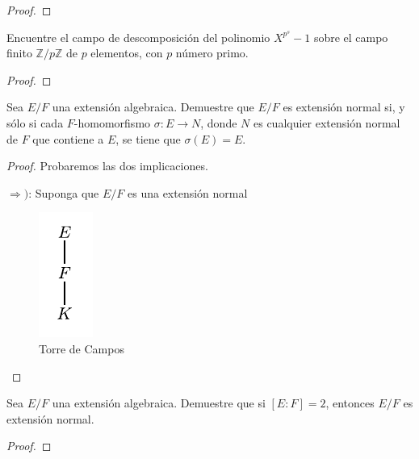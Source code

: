 \documentclass[12pt]{report}
\theoremstyle{largebreak}
\begin{document}
\begin{proof}
    
\end{proof}

\begin{excer}
    Encuentre el campo de descomposición del polinomio $X^{p^s}-1$ sobre el campo finito $\mathbb{Z}/p\mathbb{Z}$ de $p$ elementos, con $p$ número primo.
\end{excer}

\begin{proof}
    
\end{proof}

\begin{excer}
    Sea $E/F$ una extensión algebraica. Demuestre que $E/F$ es extensión normal si, y sólo si cada $F$-homomorfismo $\sigma:E\rightarrow N$, donde $N$ es cualquier extensión normal de $F$ que contiene a $E$, se tiene que $\sigma(E)=E$.
\end{excer}

\begin{proof}
    Probaremos las dos implicaciones.

    $\Rightarrow)$: Suponga que $E/F$ es una extensión normal 

    \begin{figure}
        \begin{center}
            \includegraphics[scale=2.5]{Figures/torre_de_campos.pdf}
        \end{center}
        \caption{Torre de Campos}
    \end{figure}

    \lipsum
\end{proof}

\begin{excer}
    Sea $E/F$ una extensión algebraica. Demuestre que si $[E:F]=2$, entonces $E/F$ es extensión normal.
\end{excer}

\begin{proof}
    
\end{proof}
\end{document}
